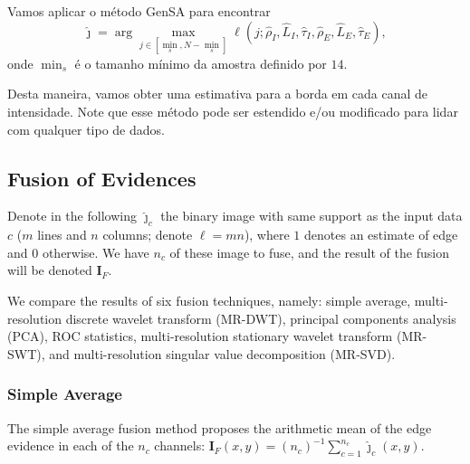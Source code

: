 \documentclass[journal]{IEEEtran}
\begin{document}
Vamos aplicar o método GenSA para encontrar
$$
\widehat{\jmath}= \arg\max\limits_{j\in [\min_s,N-\min_s]}\ell(j;\widehat{\rho}_I, \widehat{L}_I,\widehat{\tau}_I,\widehat{\rho}_E, \widehat{L}_E, \widehat{\tau}_E),
$$ 
onde $\min_s$ é o tamanho mínimo da amostra definido por $14$.

Desta maneira, vamos obter uma estimativa para a borda em cada canal de intensidade.
Note que esse método pode ser estendido e/ou modificado para lidar com qualquer tipo de dados.


\subsection{Fusion of Evidences}\label{sec_04}

Denote in the following $\widehat{\bm\jmath}_c$ the binary image with same support as the input data $c$ ($m$ lines and $n$ columns; denote $\ell=mn$), where $1$ denotes an estimate of edge and $0$ otherwise.
We have $n_c$ of these image to fuse, and the result of the fusion will be denoted $\bm I_F$.

We compare the results of six fusion techniques, namely:
simple average, 
multi-resolution discrete wavelet transform (MR-DWT),
principal components analysis (PCA), 
ROC statistics,
multi-resolution stationary wavelet transform (MR-SWT), and
multi-resolution singular value decomposition (MR-SVD).



\subsubsection{Simple Average}
The simple average fusion method proposes the arithmetic mean of the edge evidence in each of the $n_c$ channels:
$\bm I_F(x,y)=(n_c)^{-1}\sum_{c=1}^{n_c} \widehat{\bm\jmath}_c(x,y)$.
\end{document}
